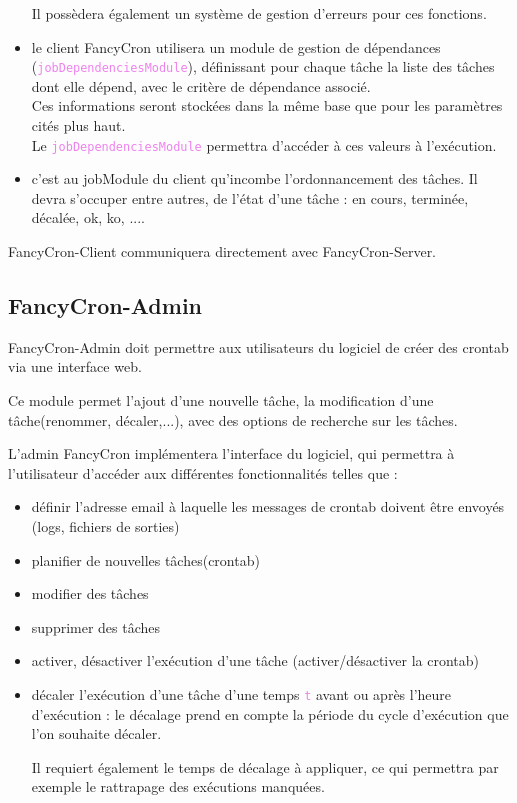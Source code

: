 \documentclass{bouygues-fr}
\begin{document}
\begin{itemize}
Il possèdera également un système de gestion d'erreurs pour ces fonctions.
\item le client FancyCron utilisera un module de gestion de dépendances (\textcolor{violet}{\texttt{jobDependenciesModule}}), définissant pour chaque tâche la liste des tâches dont elle dépend, avec le critère de dépendance associé.\\
  Ces informations seront stockées dans la même base que pour les paramètres cités plus haut.\\ Le \textcolor{violet}{\texttt{jobDependenciesModule}} permettra d'accéder à ces valeurs à l'exécution.
\item c'est au jobModule du client qu'incombe l'ordonnancement des tâches. Il devra s'occuper entre autres, de l'état d'une tâche : en cours, terminée, décalée,
 ok, ko, ....
\end{itemize}

FancyCron-Client communiquera directement avec FancyCron-Server.

\subsection{FancyCron-Admin}
FancyCron-Admin doit permettre aux utilisateurs du logiciel de créer des crontab via une interface web.

Ce module permet l'ajout d'une nouvelle tâche, la modification d'une tâche(renommer, décaler,...), avec des options de recherche sur les tâches.

L'admin FancyCron implémentera l'interface du logiciel, qui permettra à l'utilisateur d'accéder aux différentes fonctionnalités telles que :
\begin{itemize}
\item définir l'adresse email à laquelle les messages de crontab doivent être envoyés (logs, fichiers de sorties)
\item planifier de nouvelles tâches(crontab)
\item modifier des tâches
\item supprimer des tâches
\item activer, désactiver l'exécution d'une tâche (activer/désactiver la crontab)
\item décaler l'exécution d'une tâche d'une temps \textcolor{violet}{\texttt{t}} avant ou après l'heure d'exécution : le décalage prend en compte la période du cycle d'exécution que l'on souhaite décaler.

Il requiert également le temps de décalage à appliquer, ce qui permettra par exemple le rattrapage des exécutions manquées.
\end{itemize}
\end{document}
